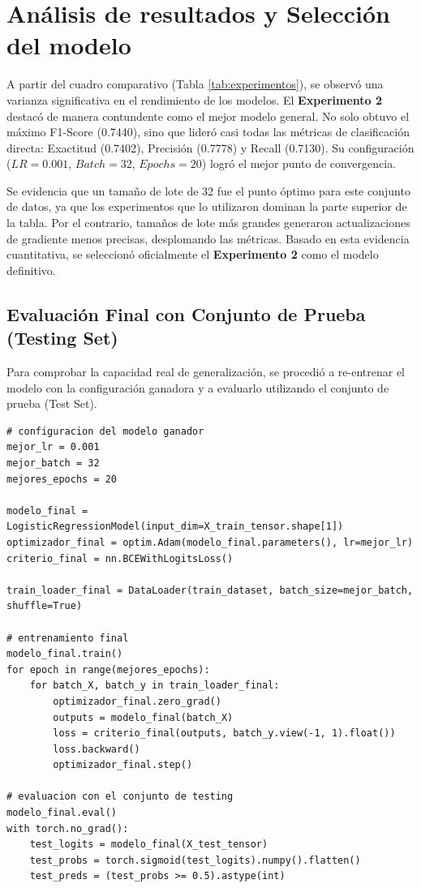 \documentclass[conference]{IEEEtran}
\begin{document}
\section{Análisis de resultados y Selección del modelo}

A partir del cuadro comparativo (Tabla \ref{tab:experimentos}), se observó una varianza significativa en el rendimiento de los modelos. El \textbf{Experimento 2} destacó de manera contundente como el mejor modelo general. No solo obtuvo el máximo F1-Score (0.7440), sino que lideró casi todas las métricas de clasificación directa: Exactitud (0.7402), Precisión (0.7778) y Recall (0.7130). Su configuración ($LR = 0.001$, $Batch = 32$, $Epochs = 20$) logró el mejor punto de convergencia.

Se evidencia que un tamaño de lote de 32 fue el punto óptimo para este conjunto de datos, ya que los experimentos que lo utilizaron dominan la parte superior de la tabla. Por el contrario, tamaños de lote más grandes generaron actualizaciones de gradiente menos precisas, desplomando las métricas. Basado en esta evidencia cuantitativa, se seleccionó oficialmente el \textbf{Experimento 2} como el modelo definitivo.

\subsection{Evaluación Final con Conjunto de Prueba (Testing Set)}

Para comprobar la capacidad real de generalización, se procedió a re-entrenar el modelo con la configuración ganadora y a evaluarlo utilizando el conjunto de prueba (Test Set).

\begin{lstlisting}[caption={Re-entrenamiento y evaluación con el conjunto de pruebas}, label={lst:testing}]
# configuracion del modelo ganador
mejor_lr = 0.001
mejor_batch = 32
mejores_epochs = 20

modelo_final = LogisticRegressionModel(input_dim=X_train_tensor.shape[1])
optimizador_final = optim.Adam(modelo_final.parameters(), lr=mejor_lr)
criterio_final = nn.BCEWithLogitsLoss()

train_loader_final = DataLoader(train_dataset, batch_size=mejor_batch, shuffle=True)

# entrenamiento final
modelo_final.train()
for epoch in range(mejores_epochs):
    for batch_X, batch_y in train_loader_final:
        optimizador_final.zero_grad()
        outputs = modelo_final(batch_X)
        loss = criterio_final(outputs, batch_y.view(-1, 1).float())
        loss.backward()
        optimizador_final.step()

# evaluacion con el conjunto de testing
modelo_final.eval()
with torch.no_grad():
    test_logits = modelo_final(X_test_tensor)
    test_probs = torch.sigmoid(test_logits).numpy().flatten()
    test_preds = (test_probs >= 0.5).astype(int)
\end{lstlisting}
\end{document}
